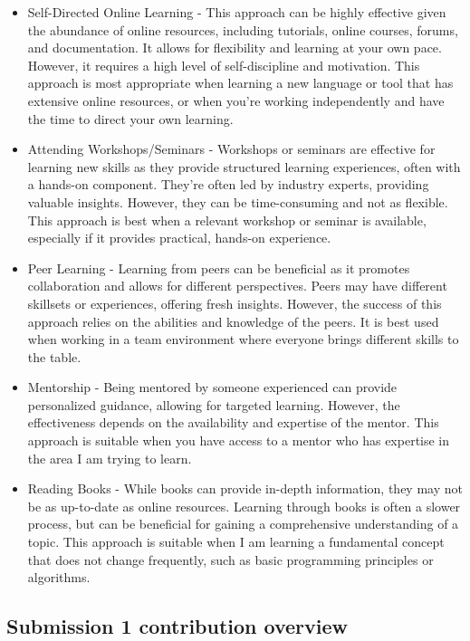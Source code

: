 \documentclass[a4paper, 11pt]{report}
\begin{document}
\begin{itemize}
\item Self-Directed Online Learning - This approach can be highly effective given the abundance of online resources, including tutorials, online courses, forums, and documentation. It allows for flexibility and learning at your own pace. However, it requires a high level of self-discipline and motivation. This approach is most appropriate when learning a new language or tool that has extensive online resources, or when you're working independently and have the time to direct your own learning.

\item Attending Workshops/Seminars - Workshops or seminars are effective for learning new skills as they provide structured learning experiences, often with a hands-on component. They're often led by industry experts, providing valuable insights. However, they can be time-consuming and not as flexible. This approach is best when a relevant workshop or seminar is available, especially if it provides practical, hands-on experience.

\item Peer Learning - Learning from peers can be beneficial as it promotes collaboration and allows for different perspectives. Peers may have different skillsets or experiences, offering fresh insights. However, the success of this approach relies on the abilities and knowledge of the peers. It is best used when working in a team environment where everyone brings different skills to the table.

\item Mentorship - Being mentored by someone experienced can provide personalized guidance, allowing for targeted learning. However, the effectiveness depends on the availability and expertise of the mentor. This approach is suitable when you have access to a mentor who has expertise in the area I am trying to learn.

\item Reading Books - While books can provide in-depth information, they may not be as up-to-date as online resources. Learning through books is often a slower process, but can be beneficial for gaining a comprehensive understanding of a topic. This approach is suitable when I am learning a fundamental concept that does not change frequently, such as basic programming principles or algorithms.
\end{itemize}


\subsection{Submission 1 contribution overview}
\end{document}
